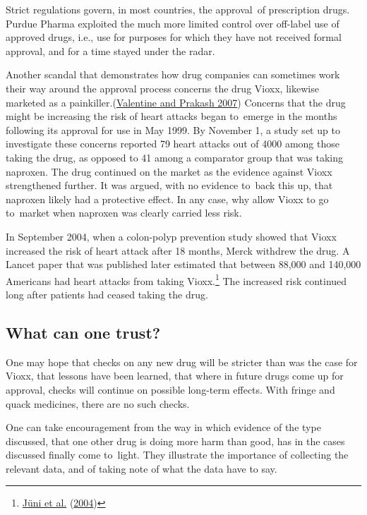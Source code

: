 \documentclass[
  10pt,
  b5paper]{book}
\begin{document}
Strict regulations govern, in most countries, the approval~of
prescription drugs. Purdue Pharma exploited the much more
limited control over off-label use of approved drugs, i.e.,
use for purposes for which they have not received formal
approval, and for a time stayed under the radar.

Another scandal that demonstrates how drug companies can
sometimes work their way around the approval process
concerns the drug Vioxx, likewise marketed as a
painkiller.(\protect\hyperlink{ref-valentine2007timeline}{Valentine and Prakash 2007}) Concerns that the
drug might be increasing the risk of heart attacks began
to~emerge in the months following its approval for use
in May 1999. By November 1, a study set up to investigate
these concerns reported 79 heart attacks out of 4000
among those taking the drug, as opposed to 41 among a
comparator group that was taking naproxen. The drug
continued on the market as the evidence against Vioxx
strengthened further. It was argued, with no evidence
to~back this up, that naproxen likely had a protective
effect. In any case, why allow Vioxx to go to~market
when naproxen was clearly carried less risk.

In September 2004,
when a colon-polyp prevention study showed that Vioxx
increased the risk of heart attack after 18 months,
Merck withdrew the drug. A Lancet paper that was
published later estimated that between 88,000 and
140,000 Americans had heart attacks from taking
Vioxx.\footnote{\protect\hyperlink{ref-juni2004risk}{Jüni et al.} (\protect\hyperlink{ref-juni2004risk}{2004})} The increased risk continued
long after patients had ceased taking the drug.

\hypertarget{what-can-one-trust}{%
\subsection*{What can one trust?}\label{what-can-one-trust}}

One may hope that checks on any new drug will be
stricter than was the case for Vioxx, that lessons
have been learned, that where in future drugs come
up for approval, checks will continue on possible
long-term effects. With fringe and quack medicines,
there are no such checks.

One can take encouragement from the way in which
evidence of the type discussed, that one other drug
is doing more harm than good, has in the cases
discussed finally come to~light. They illustrate
the importance of collecting the relevant data, and
of taking note of what the data have to say.
\end{document}
